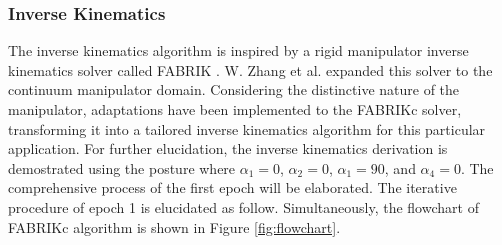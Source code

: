 \subsubsection{Inverse Kinematics} %
The inverse kinematics algorithm is inspired by a rigid manipulator inverse kinematics solver called FABRIK 
\cite{fabrik}. W. Zhang et al.\cite{fabrikc} expanded this solver to the continuum manipulator domain. Considering 
the distinctive nature of the manipulator, adaptations have been implemented to the FABRIKc solver, transforming it 
into a tailored inverse kinematics algorithm for this particular application. For further elucidation, the inverse 
kinematics derivation is demostrated using the posture where $\alpha_1 = 0$, $\alpha_2 = 0$, $\alpha_1 = 90$, and 
$\alpha_4 = 0$. The comprehensive process of the first epoch will be elaborated. The iterative procedure of epoch 1 
is elucidated as follow. Simultaneously, the flowchart of FABRIKc algorithm is shown in Figure \ref{fig:flowchart}. \\
